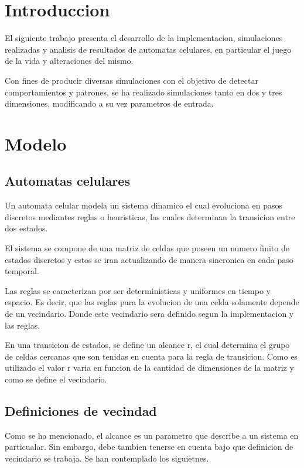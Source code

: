 \documentclass[11pt]{article}
\begin{document}
    \tableofcontents


    \section{Introduccion}\label{sec:introduccion}
    El siguiente trabajo presenta el desarrollo de la implementacion, simulaciones realizadas y analisis de resultados de
    automatas celulares, en particular el juego de la vida y alteraciones del mismo.

    Con fines de producir diversas simulaciones con el objetivo de detectar comportamientos y patrones, se ha realizado
    simulaciones tanto en dos y tres dimensiones, modificando a su vez parametros de entrada.

    \section{Modelo}\label{sec:modelo}

    \subsection{Automatas celulares}\label{subsec:automatas-celulares}

    Un automata celular modela un sistema dinamico el cual evoluciona en pasos discretos mediantes reglas o heuristicas,
     las cuales determinan la transicion entre dos estados.

    El sistema se compone de una matriz de celdas que poseen un numero finito de estados discretos y estos se iran actualizando
    de manera sincronica en cada paso temporal.

    Las reglas se caracterizan por ser deterministicas y uniformes en tiempo y espacio. Es decir, que las reglas para la evolucion
    de una celda solamente depende de un vecindario. Donde este vecindario sera definido segun la implementacion y las reglas.

    En una transicion de estados, se define un alcance r, el cual determina el grupo de celdas cercanas que son tenidas
    en cuenta para la regla de transicion. Como es utilizado el valor r varia en funcion de la cantidad de dimensiones de
    la matriz y como se define el vecindario.

    \subsection{Definiciones de vecindad}\label{subsec:definiciones-de-vecindad}
    Como se ha mencionado, el alcance es un parametro que describe a un sistema en particualar. Sin embargo, debe tambien
    tenerse en cuenta bajo que definicion de vecindario se trabaja. Se han contemplado los siguietnes.
\end{document}
